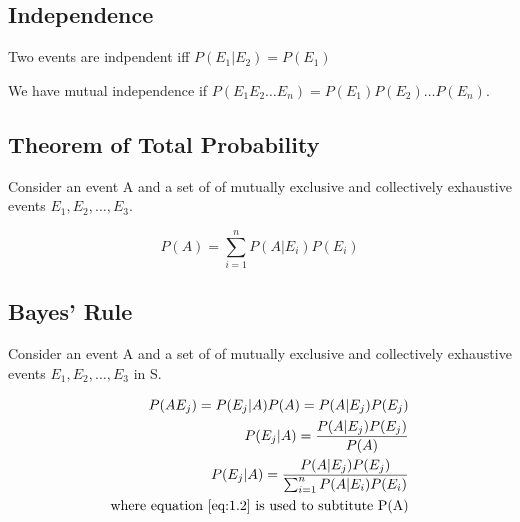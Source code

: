 \vspace{.5cm}

\subsection*{Independence}
Two events are indpendent iff $P(E_1|E_2) = P(E_1)$

We have mutual independence if $P(E_1E_2 \ldots E_n) = P(E_1)P(E_2) \ldots P(E_n)$.

\vspace{.5cm}

\subsection*{Theorem of Total Probability}
Consider an event A and a set of of mutually exclusive and collectively exhaustive events $E_1, E_2, \ldots, E_3$.

\begin{equation} \label{eq:1.2}
    P(A) = \sum_{i=1}^{n}P(A|E_i)P(E_i)
\end{equation}

\vspace{.5cm}

\vspace{.5cm}

\subsection*{Bayes' Rule}
Consider an event A and a set of of mutually exclusive and collectively exhaustive events $E_1, E_2, \ldots, E_3$ in S.

\begin{align*}
    P(AE_j) = P(E_j|A)P(A) = P(A|E_j)P(E_j) \\
    P(E_j|A) = \frac{P(A|E_j)P(E_j)}{P(A)} \\
    P(E_j|A) = \frac{P(A|E_j)P(E_j)}{\sum_{i=1}^{n}P(A|E_i)P(E_i)}\\ \text{where equation~\ref{eq:1.2} is used to subtitute P(A)}
\end{align*}